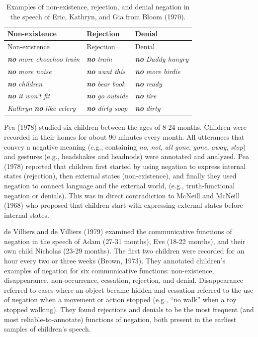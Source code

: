 \documentclass[
  english,
  man,floatsintext]{apa6}
\begin{document}
\begin{longtable}[]{@{}lll@{}}
\caption{\label{tab:bloom} Examples of non-existence, rejection, and denial negation in the speech of Eric, Kathryn, and Gia from Bloom (1970).}\tabularnewline
\toprule
Non-existence & Rejection & Denial \\
\midrule
\endfirsthead
\toprule
Non-existence & Rejection & Denial \\
\midrule
\endhead
\textbf{\emph{no}} \emph{more choochoo train} & \textbf{\emph{no}} \emph{train} & \textbf{\emph{no}} \emph{Daddy hungry} \\
\textbf{\emph{no}} \emph{more noise} & \textbf{\emph{no}} \emph{want this} & \textbf{\emph{no}} \emph{more birdie} \\
\textbf{\emph{no}} \emph{children} & \textbf{\emph{no}} \emph{bear book} & \textbf{\emph{no}} \emph{ready} \\
\textbf{\emph{no}} \emph{it won't fit} & \textbf{\emph{no}} \emph{go outside} & \textbf{\emph{no}} \emph{tire} \\
\emph{Kathryn} \textbf{\emph{no}} \emph{like celery} & \textbf{\emph{no}} \emph{dirty soap} & \textbf{\emph{no}} \emph{dirty} \\
\bottomrule
\end{longtable}

Pea (1978) studied six children between the ages of 8-24 months. Children were recorded in their homes for about 90 minutes every month. All utterances that convey a negative meaning (e.g., containing \emph{no}, \emph{not}, \emph{all gone}, \emph{gone}, \emph{away}, \emph{stop}) and gestures (e.g., headshakes and headnods) were annotated and analyzed. Pea (1978) reported that children first started by using negation to express internal states (rejection), then external states (non-existence), and finally they used negation to connect language and the external world, (e.g., truth-functional negation or denials). This was in direct contradiction to McNeill and McNeill (1968) who proposed that children start with expressing external states before internal states.

de Villiers and de Villiers (1979) examined the communicative functions of negation in the speech of Adam (27-31 months), Eve (18-22 months), and their own child Nicholas (23-29 months). The first two children were recorded for an hour every two or three weeks (Brown, 1973). They annotated children's examples of negation for six communicative functions: non-existence, disappearance, non-occurrence, cessation, rejection, and denial. Disappearance referred to cases where an object became hidden and cessation referred to the use of negation when a movement or action stopped (e.g., ``no walk'' when a toy stopped walking). They found rejections and denials to be the most frequent (and most reliable-to-annotate) functions of negation, both present in the earliest samples of children's speech.
\end{document}
